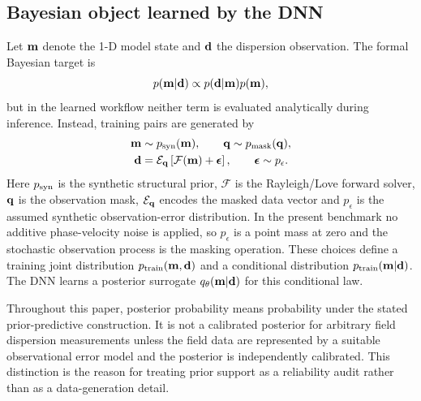 \documentclass[referee]{gji}
\begin{document}
\subsection{Bayesian object learned by the DNN}

Let ${\bf m}$ denote the 1-D model state and ${\bf d}$ the dispersion observation. The formal Bayesian target is
\begin{equation}
p({\bf m}|{\bf d}) \propto p({\bf d}|{\bf m})p({\bf m}),
\label{eq:bayes}
\end{equation}
but in the learned workflow neither term is evaluated analytically during inference. Instead, training pairs are generated by
\begin{equation}
\begin{split}
{\bf m}&\sim p_{\rm syn}({\bf m}),\qquad
{\bf q}\sim p_{\rm mask}({\bf q}),\\
{\bf d}&=\mathcal{E}_{\bf q}\left[\mathcal{F}({\bf m})+\boldsymbol{\epsilon}\right],
\qquad
\boldsymbol{\epsilon}\sim p_\epsilon .
\end{split}
\label{eq:priorpredictive}
\end{equation}
Here $p_{\rm syn}$ is the synthetic structural prior, $\mathcal{F}$ is the Rayleigh/Love forward solver, ${\bf q}$ is the observation mask, $\mathcal{E}_{\bf q}$ encodes the masked data vector and $p_\epsilon$ is the assumed synthetic observation-error distribution. In the present benchmark no additive phase-velocity noise is applied, so $p_\epsilon$ is a point mass at zero and the stochastic observation process is the masking operation. These choices define a training joint distribution $p_{\rm train}({\bf m},{\bf d})$ and a conditional distribution $p_{\rm train}({\bf m}|{\bf d})$. The DNN learns a posterior surrogate $q_\theta({\bf m}|{\bf d})$ for this conditional law.

Throughout this paper, posterior probability means probability under the stated prior-predictive construction. It is not a calibrated posterior for arbitrary field dispersion measurements unless the field data are represented by a suitable observational error model and the posterior is independently calibrated. This distinction is the reason for treating prior support as a reliability audit rather than as a data-generation detail.
\end{document}
